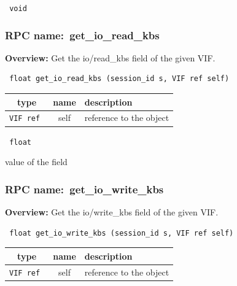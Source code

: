 \vspace{0.3cm}

{\tt 
void
}



\vspace{0.3cm}
\vspace{0.3cm}
\vspace{0.3cm}
\subsubsection{RPC name:~get\_io\_read\_kbs}

{\bf Overview:} 
Get the io/read\_kbs field of the given VIF.

\begin{verbatim} float get_io_read_kbs (session_id s, VIF ref self)\end{verbatim}



 
\vspace{0.3cm}
\begin{tabular}{|c|c|p{7cm}|}
 \hline
{\bf type} & {\bf name} & {\bf description} \\ \hline
{\tt VIF ref } & self & reference to the object \\ \hline 

\end{tabular}

\vspace{0.3cm}

{\tt 
float
}


value of the field
\vspace{0.3cm}
\vspace{0.3cm}
\vspace{0.3cm}
\subsubsection{RPC name:~get\_io\_write\_kbs}

{\bf Overview:} 
Get the io/write\_kbs field of the given VIF.

\begin{verbatim} float get_io_write_kbs (session_id s, VIF ref self)\end{verbatim}



 
\vspace{0.3cm}
\begin{tabular}{|c|c|p{7cm}|}
 \hline
{\bf type} & {\bf name} & {\bf description} \\ \hline
{\tt VIF ref } & self & reference to the object \\ \hline 

\end{tabular}

